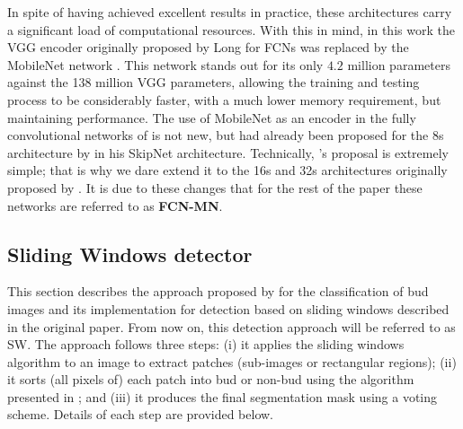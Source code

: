 \documentclass[a4paper,authoryear,review]{elsarticle}
\begin{document}
	In spite of having achieved excellent results in practice, these architectures carry a significant load of computational resources. With this in mind, in this work the VGG encoder \citet{Simonyan2015VeryDC} originally proposed by Long for FCNs was replaced by the MobileNet network \citet{howard2017mobilenets}. This network stands out for its only $4.2$ million parameters against the 138 million VGG parameters, allowing the training and testing process to be considerably faster, with a much lower memory requirement, but maintaining performance. The use of MobileNet as an encoder in the fully convolutional networks of \citet{long2015fully} is not new, but had already been proposed for the 8s architecture by \citet{siam2018rtseg} in his SkipNet architecture. Technically, \citet{siam2018rtseg}’s proposal is extremely simple; that is why we dare extend it to the 16s and 32s architectures originally proposed by \citep{long2015fully}. It is due to these changes that for the rest of the paper these networks are referred to as \textbf{FCN-MN}.
	
	\subsection{Sliding Windows detector}
	\label{sec:sw}
	
	This section describes the approach proposed by \citet{perez2017image} for the classification of bud images and its implementation for detection based on sliding windows described in the original paper. From now on, this detection approach will be referred to as SW. The approach follows three steps: (i) it applies the sliding windows algorithm to an image to extract patches (sub-images or rectangular regions); (ii) it sorts (all pixels of) each patch into bud or non-bud using the algorithm presented in \citet{perez2017image}; and (iii) it produces the final segmentation mask using a voting scheme. Details of each step are provided below.
	
\end{document}

